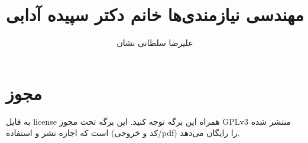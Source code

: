 \documentclass[a4paper]{article}
\title{مهندسی نیازمندی‌ها خانم دکتر سپیده آدابی}
\author{علیرضا سلطانی نشان}
\begin{document}
\maketitle
\tableofcontents

\section{مجوز}

به فایل license همراه این برگه توجه کنید. این برگه تحت مجوز GPLv3 منتشر شده است
که اجازه نشر و استفاده (کد و خروجی/pdf) را رایگان می‌دهد.




% 
\end{document}
